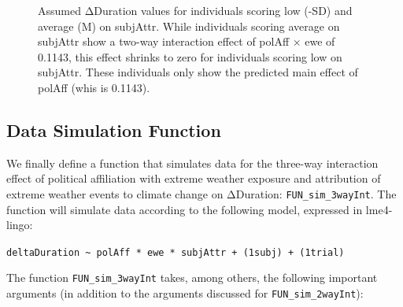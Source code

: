 \documentclass[
  letterpaper,
  DIV=11,
  numbers=noendperiod]{scrartcl}
\begin{document}
\begin{figure}


\caption{\label{fig-trueEffects_3wayInt}Assumed ΔDuration values for
individuals scoring low (-SD) and average (M) on subjAttr. While
individuals scoring average on subjAttr show a two-way interaction
effect of polAff × ewe of 0.1143, this effect shrinks to zero for
individuals scoring low on subjAttr. These individuals only show the
predicted main effect of polAff (whis is 0.1143).}

\end{figure}%

\subsection{Data Simulation Function}\label{data-simulation-function-2}

We finally define a function that simulates data for the three-way
interaction effect of political affiliation with extreme weather
exposure and attribution of extreme weather events to climate change on
ΔDuration: \texttt{FUN\_sim\_3wayInt}. The function will simulate data
according to the following model, expressed in lme4-lingo:

\texttt{deltaDuration\ \textasciitilde{}\ polAff\ *\ ewe\ *\ subjAttr\ +\ (1\textbar{}subj)\ +\ (1\textbar{}trial)}

The function \texttt{FUN\_sim\_3wayInt} takes, among others, the
following important arguments (in addition to the arguments discussed
for \texttt{FUN\_sim\_2wayInt}):
\end{document}

